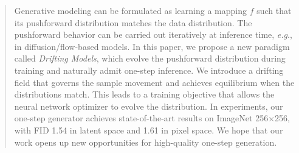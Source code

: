 \documentclass{article}
\def\onedot{.}
\def\eg{\emph{e.g}\onedot} \def\Eg{\emph{E.g}\onedot}
\theoremstyle{plain}
\theoremstyle{definition}
\theoremstyle{remark}
\begin{document}



\printAffiliationsAndNotice{}


\begin{abstract}
Generative modeling can be formulated as learning a mapping $f$ such that its pushforward distribution matches the data distribution.
The pushforward behavior can be carried out iteratively at inference time, \eg, in diffusion/flow-based models.
In this paper, we propose a new paradigm called \textit{Drifting Models}, which evolve the pushforward distribution during training and naturally admit one-step inference. 
We introduce a drifting field that governs the sample movement and achieves equilibrium when the distributions match.
This leads to a training objective that allows the neural network optimizer to evolve the distribution. 
In experiments, our one-step generator achieves state-of-the-art results on ImageNet 256$\times$256, with FID 1.54 in latent space and 1.61 in pixel space.
We hope that our work opens up new opportunities for high-quality one-step generation.
\vspace{-1.5em}
\end{abstract}
  



\end{document}
